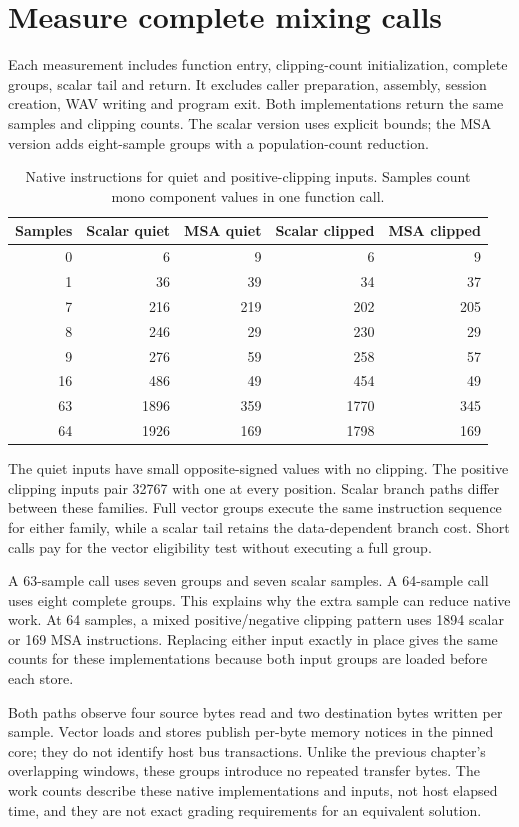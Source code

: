 \section{Measure complete mixing calls}\label{pcm-measurement}
Each measurement includes function entry, clipping-count initialization, complete
groups, scalar tail and return. It excludes caller preparation, assembly, session
creation, WAV writing and program exit. Both implementations return the same samples
and clipping counts. The scalar version uses explicit bounds; the MSA version adds
eight-sample groups with a population-count reduction.

\begin{table}[htbp]
\centering
\caption{Native instructions for quiet and positive-clipping inputs. Samples count mono component values in one function call.}
\begin{tabular}{rrrrr}
\toprule
Samples & Scalar quiet & MSA quiet & Scalar clipped & MSA clipped\\
\midrule
0 & 6 & 9 & 6 & 9\\
1 & 36 & 39 & 34 & 37\\
7 & 216 & 219 & 202 & 205\\
8 & 246 & 29 & 230 & 29\\
9 & 276 & 59 & 258 & 57\\
16 & 486 & 49 & 454 & 49\\
63 & 1896 & 359 & 1770 & 345\\
64 & 1926 & 169 & 1798 & 169\\
\bottomrule
\end{tabular}
\end{table}

The quiet inputs have small opposite-signed values with no clipping. The positive
clipping inputs pair 32767 with one at every position. Scalar branch paths differ
between these families. Full vector groups execute the same instruction sequence
for either family, while a scalar tail retains the data-dependent branch cost.
Short calls pay for the vector eligibility test without executing a full group.

A 63-sample call uses seven groups and seven scalar samples. A 64-sample call uses
eight complete groups. This explains why the extra sample can reduce native work.
At 64 samples, a mixed positive/negative clipping pattern uses 1894 scalar or 169
MSA instructions. Replacing either input exactly in place gives the same counts
for these implementations because both input groups are loaded before each store.

Both paths observe four source bytes read and two destination bytes written per
sample. Vector loads and stores publish per-byte memory notices in the pinned core;
they do not identify host bus transactions. Unlike the previous chapter's overlapping
windows, these groups introduce no repeated transfer bytes. The work counts describe
these native implementations and inputs, not host elapsed time, and they are not
exact grading requirements for an equivalent solution.
